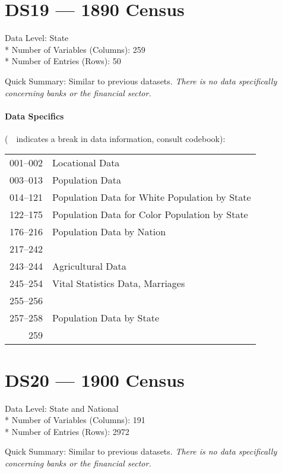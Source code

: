 ﻿\documentclass[12pt]{report}
\begin{document}
\section{DS19 --- 1890 Census}
	Data Level: State\\*
	Number of Variables (Columns): 259\\*
	Number of Entries (Rows): 50
	\vspace{1.5em}
	
	\noindent Quick Summary: Similar to previous datasets. \textit{There is no data specifically concerning banks or the financial sector.}
	
	\paragraph{Data Specifics} (\guillemotleft~\guillemotright~indicates a break in data information, consult codebook):
	\vspace{1em}
	
	\begin{tabular}{r|l}
		001--002 & Locational Data\\
		003--013 & Population Data\\
		014--121 & Population Data for White Population by State\\
		122--175 & Population Data for Color Population by State\\
		176--216 & Population Data by Nation\\
		217--242 &\guillemotleft~\guillemotright\\
		243--244 & Agricultural Data\\
		245--254 & Vital Statistics Data, Marriages\\
		255--256 & \guillemotleft~\guillemotright\\
		257--258 & Population Data by State\\
		259 & \guillemotleft~\guillemotright
	\end{tabular}
	\newpage

\section{DS20 --- 1900 Census}
	Data Level: State and National\\*
	Number of Variables (Columns): 191\\*
	Number of Entries (Rows): 2972
	\vspace{1.5em}
	
	\noindent Quick Summary: Similar to previous datasets. \textit{There is no data specifically concerning banks or the financial sector.}
	
\end{document}
